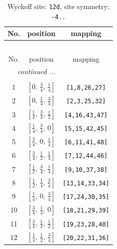 \documentclass[fleqn,8pt]{jsarticle}
\begin{document}
\begin{longtable}{ccc}
\caption{Wyckoff site: {\tt 12d}, site symmetry: {\tt -4..}}
 \\
 \hline \hline
No. & position & mapping \\ \hline \endfirsthead

\multicolumn{2}{l}{\tablename\ \thetable{}} \\
 \hline \hline
No. & position & mapping \\ \hline \endhead

 \hline \hline
\multicolumn{2}{r}{\footnotesize\it continued ...} \\ \endfoot

 \hline \hline
\multicolumn{2}{r}{} \\ \endlastfoot

1 & $\left[ 0,\, \frac{3}{4},\, \frac{1}{4} \right]$ & {\tt [1,8,26,27]} \\ \hline
2 & $\left[ 0,\, \frac{1}{4},\, \frac{3}{4} \right]$ & {\tt [2,3,25,32]} \\ \hline
3 & $\left[ \frac{1}{4},\, \frac{3}{4},\, \frac{1}{2} \right]$ & {\tt [4,16,43,47]} \\ \hline
4 & $\left[ \frac{1}{4},\, \frac{3}{4},\, 0 \right]$ & {\tt [5,15,42,45]} \\ \hline
5 & $\left[ \frac{3}{4},\, 0,\, \frac{1}{4} \right]$ & {\tt [6,11,41,48]} \\ \hline
6 & $\left[ \frac{3}{4},\, \frac{1}{2},\, \frac{1}{4} \right]$ & {\tt [7,12,44,46]} \\ \hline
7 & $\left[ \frac{1}{2},\, \frac{3}{4},\, \frac{1}{4} \right]$ & {\tt [9,10,37,38]} \\ \hline
8 & $\left[ \frac{1}{2},\, \frac{1}{4},\, \frac{3}{4} \right]$ & {\tt [13,14,33,34]} \\ \hline
9 & $\left[ \frac{1}{4},\, 0,\, \frac{3}{4} \right]$ & {\tt [17,24,30,35]} \\ \hline
10 & $\left[ \frac{3}{4},\, \frac{1}{4},\, 0 \right]$ & {\tt [18,21,29,39]} \\ \hline
11 & $\left[ \frac{3}{4},\, \frac{1}{4},\, \frac{1}{2} \right]$ & {\tt [19,23,28,40]} \\ \hline
12 & $\left[ \frac{1}{4},\, \frac{1}{2},\, \frac{3}{4} \right]$ & {\tt [20,22,31,36]} \\
\end{longtable}
\renewcommand{\arraystretch}{1.2}
\end{document}
